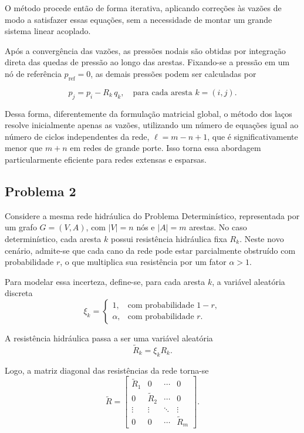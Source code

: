 \documentclass{article}
\begin{document}
O método procede então de forma iterativa, aplicando correções às vazões
de modo a satisfazer essas equações, sem a necessidade de montar um
grande sistema linear acoplado.

Após a convergência das vazões, as pressões nodais são obtidas por
integração direta das quedas de pressão ao longo das arestas. Fixando-se
a pressão em um nó de referência $p_{\text{ref}} = 0$, as demais pressões
podem ser calculadas por

\begin{equation}
p_j = p_i - R_k\,q_k,
\quad \text{para cada aresta } k = (i,j).
\end{equation}

Dessa forma, diferentemente da formulação matricial global, o método
dos laços resolve inicialmente apenas as vazões, utilizando um número de
equações igual ao número de ciclos independentes da rede,
$\ell = m-n+1$, que é significativamente menor que $m+n$ em redes
de grande porte. Isso torna essa abordagem particularmente eficiente
para redes extensas e esparsas.


\subsection{Problema 2}

Considere a mesma rede hidráulica do Problema Determinístico,
representada por um grafo \( G=(V,A) \), com \( |V|=n \) nós e \( |A|=m \) arestas.
No caso determinístico, cada aresta \(k\) possui resistência hidráulica fixa \(R_k\).
Neste novo cenário, admite-se que cada cano da rede pode estar parcialmente obstruído
com probabilidade \(r\), o que multiplica sua resistência por um fator \(\alpha>1\).

Para modelar essa incerteza, define-se, para cada aresta \(k\), a variável aleatória discreta
\[
\xi_k =
\begin{cases}
1, & \text{com probabilidade } 1-r, \\[6pt]
\alpha, & \text{com probabilidade } r.
\end{cases}
\]

A resistência hidráulica passa a ser uma variável aleatória
\[
\widetilde{R}_k = \xi_k R_k.
\]

Logo, a matriz diagonal das resistências da rede torna-se
\[
\widetilde{R} =
\begin{bmatrix}
\widetilde{R}_1 & 0 & \cdots & 0 \\
0 & \widetilde{R}_2 & \cdots & 0 \\
\vdots & \vdots & \ddots & \vdots \\
0 & 0 & \cdots & \widetilde{R}_m
\end{bmatrix}.
\]
\end{document}
